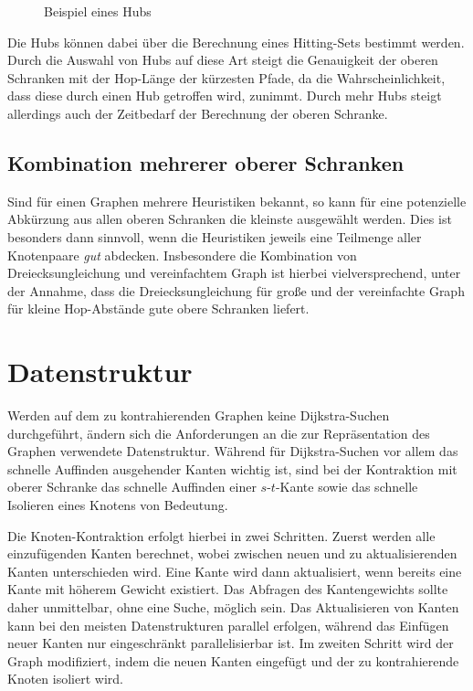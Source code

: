 \begin{figure}[h!]
  \centering

  \caption{Beispiel eines Hubs}
\end{figure}

Die Hubs können dabei über die Berechnung eines Hitting-Sets bestimmt werden.
Durch die Auswahl von Hubs auf diese Art steigt die Genauigkeit der oberen Schranken mit der Hop-Länge der kürzesten Pfade, da die Wahrscheinlichkeit, dass diese durch einen Hub getroffen wird, zunimmt.
Durch mehr Hubs steigt allerdings auch der Zeitbedarf der Berechnung der oberen Schranke.

\subsection{Kombination mehrerer oberer Schranken}
Sind für einen Graphen mehrere Heuristiken bekannt, so kann für eine potenzielle Abkürzung aus allen oberen Schranken die kleinste ausgewählt werden.
Dies ist besonders dann sinnvoll, wenn die Heuristiken jeweils eine Teilmenge aller Knotenpaare \emph{gut} abdecken.
Insbesondere die Kombination von Dreiecksungleichung und vereinfachtem Graph ist hierbei vielversprechend, unter der Annahme, dass die Dreiecksungleichung für große und der vereinfachte Graph für kleine Hop-Abstände gute obere Schranken liefert.

\section{Datenstruktur}

Werden auf dem zu kontrahierenden Graphen keine Dijkstra-Suchen durchgeführt, ändern sich die Anforderungen an die zur Repräsentation des Graphen verwendete Datenstruktur.
Während für Dijkstra-Suchen vor allem das schnelle Auffinden ausgehender Kanten wichtig ist, sind bei der Kontraktion mit oberer Schranke das schnelle Auffinden einer $s$-$t$-Kante sowie das schnelle Isolieren eines Knotens von Bedeutung.

Die Knoten-Kontraktion erfolgt hierbei in zwei Schritten.
Zuerst werden alle einzufügenden Kanten berechnet, wobei zwischen neuen und zu aktualisierenden Kanten unterschieden wird.
Eine Kante wird dann aktualisiert, wenn bereits eine Kante mit höherem Gewicht existiert.
Das Abfragen des Kantengewichts sollte daher unmittelbar, ohne eine Suche, möglich sein.
Das Aktualisieren von Kanten kann bei den meisten Datenstrukturen parallel erfolgen, während das Einfügen neuer Kanten nur eingeschränkt parallelisierbar ist.
Im zweiten Schritt wird der Graph modifiziert, indem die neuen Kanten eingefügt und der zu kontrahierende Knoten isoliert wird.

